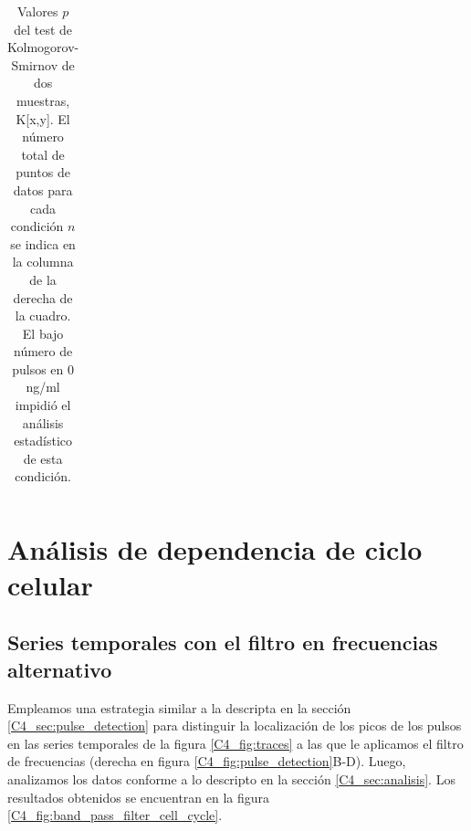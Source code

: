 \documentclass[./main.tex]{subfiles}
\begin{document}
\begin{subappendices}
\begin{table}[htbp]
\begin{adjustwidth}{-0.5in}{-0.5in}
\begin{tabular}{|l||l|l|l|l|}
\end{tabular}
\end{adjustwidth}
\caption{Valores $p$ del test de Kolmogorov-Smirnov de dos muestras, K[x,y]. El número total de puntos de datos para cada condición $n$ se indica en la columna de la derecha de la cuadro. El bajo número de pulsos en 0 ng/ml impidió el análisis estadístico de esta condición.}
\label{C3_ap_tab:KS}
\end{table}

\chapter{Análisis de dependencia de ciclo celular}

\section{Series temporales con el filtro en frecuencias alternativo}
\label{C4_ap:band_pass_filter_cell_cycle}

Empleamos una estrategia similar a la descripta en la sección \ref{C4_sec:pulse_detection} para distinguir la localización de los picos de los pulsos en las series temporales de la figura \ref{C4_fig:traces} a las que le aplicamos el filtro de frecuencias (derecha en figura \ref{C4_fig:pulse_detection}B-D). Luego, analizamos los datos conforme a lo descripto en la sección \ref{C4_sec:analisis}. Los resultados obtenidos se encuentran en la figura \ref{C4_fig:band_pass_filter_cell_cycle}.


\end{subappendices}
\end{document}
